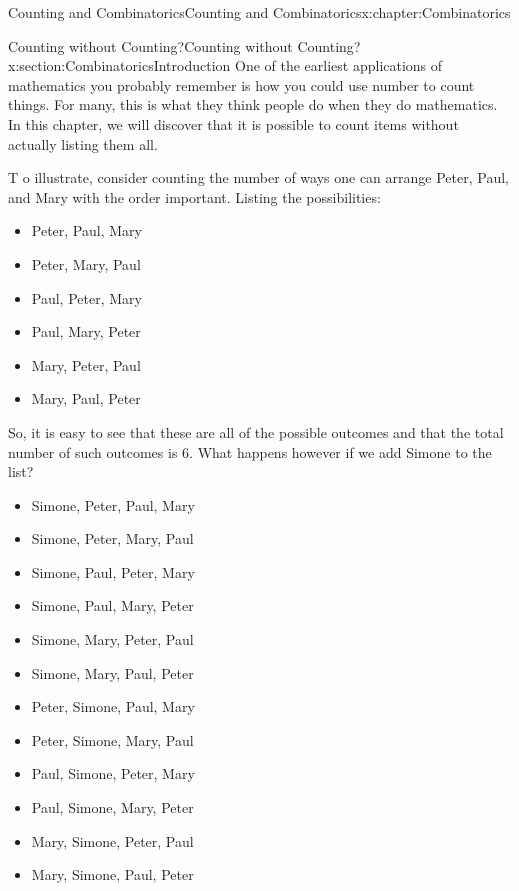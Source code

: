 \documentclass[oneside,10pt,]{book}
\numberwithin{equation}{section}
\begin{document}
%
\begin{chapterptx}{Counting and Combinatorics}{}{Counting and Combinatorics}{}{}{x:chapter:Combinatorics}
%
%
\typeout{************************************************}
\typeout{************************************************}
%
\begin{sectionptx}{Counting without Counting?}{}{Counting without Counting?}{}{}{x:section:CombinatoricsIntroduction}
One of the earliest applications of mathematics you probably remember is how you could use number to count things. For many, this is what they think people do when they do mathematics. In this chapter, we will discover that it is possible to count items without actually listing them all.%
\par
T o illustrate, consider counting the number of ways one can arrange Peter, Paul, and Mary with the order important.  Listing the possibilities:%
\begin{itemize}[label=\textbullet]
\item{}Peter, Paul, Mary%
\item{}Peter, Mary, Paul%
\item{}Paul, Peter, Mary%
\item{}Paul, Mary, Peter%
\item{}Mary, Peter, Paul%
\item{}Mary, Paul, Peter%
\end{itemize}
So, it is easy to see that these are all of the possible outcomes and that the total number of such outcomes is 6. What happens however if we add Simone to the list?%
\begin{itemize}[label=\textbullet]
\item{}Simone, Peter, Paul, Mary%
\item{}Simone, Peter, Mary, Paul%
\item{}Simone, Paul, Peter, Mary%
\item{}Simone, Paul, Mary, Peter%
\item{}Simone, Mary, Peter, Paul%
\item{}Simone, Mary, Paul, Peter%
\item{}Peter, Simone, Paul, Mary%
\item{}Peter, Simone, Mary, Paul%
\item{}Paul, Simone, Peter, Mary%
\item{}Paul, Simone, Mary, Peter%
\item{}Mary, Simone, Peter, Paul%
\item{}Mary, Simone, Paul, Peter%

\end{itemize}
\end{sectionptx}
\end{chapterptx}
\end{document}
